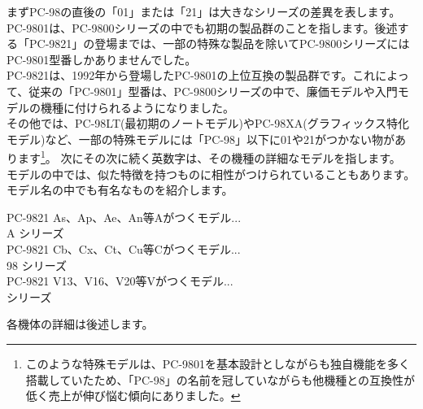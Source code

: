 \documentclass[b5paper,9pt,platex,dvipdfmx]{jsarticle}
\begin{document}
\begin{multicols}{3}
まずPC-98の直後の「01」または「21」は大きなシリーズの差異を表します。\\
PC-9801は、PC-9800シリーズの中でも初期の製品群のことを指します。後述する「PC-9821」の登場までは、一部の特殊な製品を除いてPC-9800シリーズにはPC-9801型番しかありませんでした。\\
PC-9821は、1992年から登場したPC-9801の上位互換の製品群です。これによって、従来の「PC-9801」型番は、PC-9800シリーズの中で、廉価モデルや入門モデルの機種に付けられるようになりました。\\
その他では、PC-98LT(最初期のノートモデル)やPC-98XA(グラフィックス特化モデル)など、一部の特殊モデルには「PC-98」以下に01や21がつかない物があります\footnote{このような特殊モデルは、PC-9801を基本設計としながらも独自機能を多く搭載していたため、「PC-98」の名前を冠していながらも他機種との互換性が低く売上が伸び悩む傾向にありました。}。
次にその次に続く英数字は、その機種の詳細なモデルを指します。\\
モデルの中では、似た特徴を持つものに相性がつけられていることもあります。\\
モデル名の中でも有名なものを紹介します。\\
\begin{screen}
  PC-9821 As、Ap、Ae、An等Aがつくモデル...\\
   A シリーズ\\
  PC-9821 Cb、Cx、Ct、Cu等Cがつくモデル...\\
  98  シリーズ\\
  PC-9821 V13、V16、V20等Vがつくモデル...\\
   シリーズ
  \end{screen}
  各機体の詳細は後述します。

\end{multicols}
\end{document}
